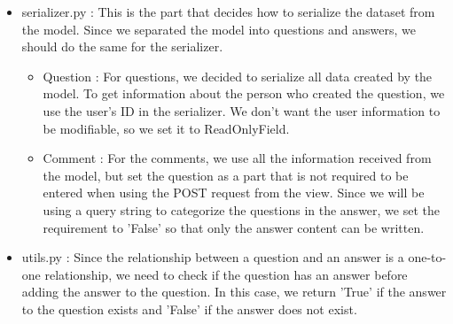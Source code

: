 \documentclass[conference, a4paper]{IEEEtran}
\begin{document}
\begin{enumerate}
\begin{itemize}
\begin{itemize}
        \item serializer.py : This is the part that decides how to serialize the dataset from the model. Since we separated the model into questions and answers, we should do the same for the serializer. \\
        \begin{itemize}
            \item Question : For questions, we decided to serialize all data created by the model. To get information about the person who created the question, we use the user's ID in the serializer. We don't want the user information to be modifiable, so we set it to ReadOnlyField. \\
            \item Comment : For the comments, we use all the information received from the model, but set the question as a part that is not required to be entered when using the POST request from the view. Since we will be using a query string to categorize the questions in the answer, we set the requirement to 'False' so that only the answer content can be written. \\
        \end{itemize}

        \item utils.py : Since the relationship between a question and an answer is a one-to-one relationship, we need to check if the question has an answer before adding the answer to the question. In this case, we return 'True' if the answer to the question exists and 'False' if the answer does not exist. \\


\end{itemize}
\end{itemize}
\end{enumerate}
\end{document}
